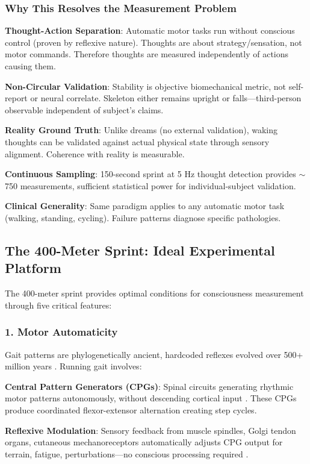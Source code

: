 \documentclass[11pt,onecolumn]{article}
\begin{document}
\subsubsection{Why This Resolves the Measurement Problem}

\textbf{Thought-Action Separation}: Automatic motor tasks run without conscious control (proven by reflexive nature). Thoughts are about strategy/sensation, not motor commands. Therefore thoughts are measured independently of actions causing them.

\textbf{Non-Circular Validation}: Stability is objective biomechanical metric, not self-report or neural correlate. Skeleton either remains upright or falls---third-person observable independent of subject's claims.

\textbf{Reality Ground Truth}: Unlike dreams (no external validation), waking thoughts can be validated against actual physical state through sensory alignment. Coherence with reality is measurable.

\textbf{Continuous Sampling}: 150-second sprint at 5 Hz thought detection provides $\sim$750 measurements, sufficient statistical power for individual-subject validation.

\textbf{Clinical Generality}: Same paradigm applies to any automatic motor task (walking, standing, cycling). Failure patterns diagnose specific pathologies.

\subsection{The 400-Meter Sprint: Ideal Experimental Platform}

The 400-meter sprint provides optimal conditions for consciousness measurement through five critical features:

\subsubsection{1. Motor Automaticity}

Gait patterns are phylogenetically ancient, hardcoded reflexes evolved over 500+ million years \citep{grillner2011biological}. Running gait involves:

\textbf{Central Pattern Generators (CPGs)}: Spinal circuits generating rhythmic motor patterns autonomously, without descending cortical input \citep{kiehn2016decoding}. These CPGs produce coordinated flexor-extensor alternation creating step cycles.

\textbf{Reflexive Modulation}: Sensory feedback from muscle spindles, Golgi tendon organs, cutaneous mechanoreceptors automatically adjusts CPG output for terrain, fatigue, perturbations---no conscious processing required \citep{dietz2002human}.
\end{document}
